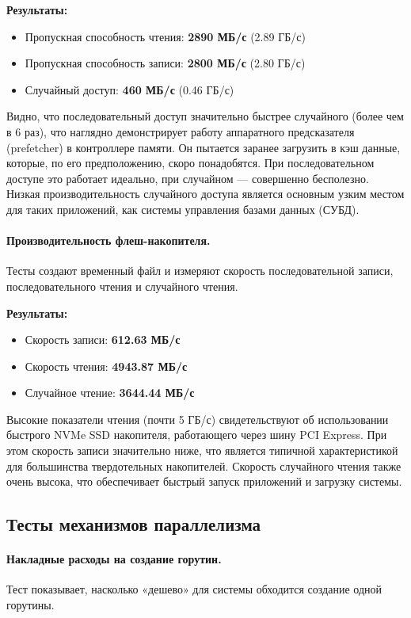 \textbf{Результаты:}
\begin{itemize}
    \item Пропускная способность чтения: \textbf{2890 МБ/с} (2.89 ГБ/с)
    \item Пропускная способность записи: \textbf{2800 МБ/с} (2.80 ГБ/с)
    \item Случайный доступ: \textbf{460 МБ/с} (0.46 ГБ/с)
\end{itemize}
Видно, что последовательный доступ значительно быстрее случайного (более чем в 6 раз), что наглядно демонстрирует работу аппаратного предсказателя (prefetcher) в контроллере памяти. Он пытается заранее загрузить в кэш данные, которые, по его предположению, скоро понадобятся. При последовательном доступе это работает идеально, при случайном — совершенно бесполезно. Низкая производительность случайного доступа является основным узким местом для таких приложений, как системы управления базами данных (СУБД).

\paragraph{Производительность флеш-накопителя.}
Тесты создают временный файл и измеряют скорость последовательной записи, последовательного чтения и случайного чтения.

\textbf{Результаты:}
\begin{itemize}
    \item Скорость записи: \textbf{612.63 МБ/с}
    \item Скорость чтения: \textbf{4943.87 МБ/с}
    \item Случайное чтение: \textbf{3644.44 МБ/с}
\end{itemize}
Высокие показатели чтения (почти 5 ГБ/с) свидетельствуют об использовании быстрого NVMe SSD накопителя, работающего через шину PCI Express. При этом скорость записи значительно ниже, что является типичной характеристикой для большинства твердотельных накопителей. Скорость случайного чтения также очень высока, что обеспечивает быстрый запуск приложений и загрузку системы.

\subsection{Тесты механизмов параллелизма}

\paragraph{Накладные расходы на создание горутин.} Тест показывает, насколько «дешево» для системы обходится создание одной горутины.

